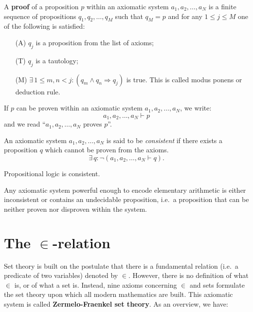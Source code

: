 \documentclass[root.tex]{subfiles}
\begin{document}
\begin{mydef}
  A \textbf{proof} of a proposition $p$ within an axiomatic system $a_1,a_2,\ldots,a_N$ is a finite sequence of propositions $q_1,q_2,\ldots,q_M$ such that $q_M=p$ and for any $1\leq j \leq M$ one of the following is satisfied:
\begin{enumerate}
\item[(A)] $q_j$ is a proposition from the list of axioms;
\item[(T)] $q_j$ is a tautology;
\item[(M)] $\exists \, 1\leq m,n <j : (q_m\land q_n \Rightarrow q_j)$ is true. This is called modus ponens or deduction rule.
\end{enumerate}
\end{mydef}
\begin{remark}

If $p$ can be proven within an axiomatic system $a_1,a_2,\ldots,a_N$, we write:
$$
a_1,a_2,\ldots,a_N \vdash p
$$
and we read ``$a_1,a_2,\ldots,a_N$ proves $p$''.
\end{remark}

\begin{mydef}
An axiomatic system $a_1,a_2,\ldots,a_N$ is said to be \emph{consistent} if there exists a proposition $q$ which cannot be proven from the axioms.
$$
\exists \, q : \neg (a_1,a_2,\ldots,a_N \vdash q).
$$
\end{mydef}

\begin{theorem}
  Propositional logic is consistent.
\end{theorem}

\begin{theorem}[Godel]
Any axiomatic system powerful enough to encode elementary arithmetic is either inconsistent or contains an undecidable proposition, i.e.\ a proposition that can be neither proven nor disproven within the system.
\end{theorem}

\section{The $\in$-relation}%

Set theory is built on the postulate that there is a fundamental relation (i.e.\ a predicate of two variables) denoted by $\in$. However, there is no definition of what $\in$ is, or of what a set is. Instead, nine axioms concerning $\in$ and sets formulate the set theory upon which all modern mathematics are built. This axiomatic system is called \textbf{Zermelo-Fraenkel set theory}. As an overview, we have:
\end{document}
